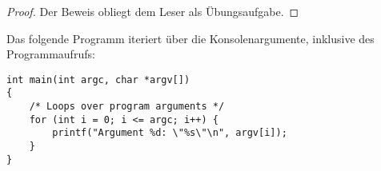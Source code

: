 \documentclass[numbers=endperiod]{scrartcl}
\begin{document}
\begin{theorem}

\end{theorem}
\begin{proof}
Der Beweis obliegt dem Leser als Übungsaufgabe.
\end{proof}

\begin{exercise}
Das folgende Programm iteriert über die Konsolenargumente, inklusive des
Programmaufrufs:
\begin{lstlisting}[style=default]
int main(int argc, char *argv[])
{
	/* Loops over program arguments */
	for (int i = 0; i <= argc; i++) {
		printf("Argument %d: \"%s\"\n", argv[i]);
	}
}
\end{lstlisting}
\end{exercise}

\end{document}
